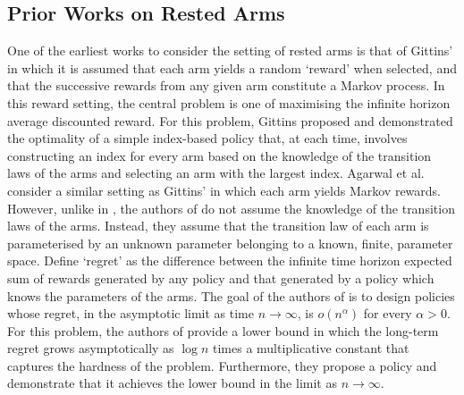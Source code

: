 \subsection{Prior Works on Rested Arms}
{One of the earliest works to consider the setting of rested arms is that of Gittins' \cite{gittins1979bandit} in which it is assumed that each arm yields a random `reward' when selected, and that the successive rewards from any given arm constitute a Markov process. In this reward setting, the central problem is one of maximising the infinite horizon average discounted reward. For this problem, Gittins proposed and demonstrated the optimality of a simple index-based policy that, at each time, involves constructing an index for every arm based on the knowledge of the transition laws of the arms and selecting an arm with the largest index. Agarwal et al. \cite{agrawal1989asymptotically} consider a similar setting as Gittins' in which each arm yields Markov rewards. However, unlike in  \cite{gittins1979bandit}, the authors of \cite{agrawal1989asymptotically} do not assume the knowledge of the transition laws of the arms. Instead, they assume that the transition law of each arm is parameterised by an unknown parameter belonging to a known, finite, parameter space. Define `regret' as the difference between the infinite time horizon expected sum of rewards generated by any policy and that generated by a policy which knows the parameters of the arms. The goal of the authors of \cite{agrawal1989asymptotically} is to design policies whose regret, in the asymptotic limit as time $n\to\infty$, is $o(n^\alpha)$ for every $\alpha>0$. For this problem, the authors of \cite{agrawal1989asymptotically} provide a lower bound in which the long-term regret grows asymptotically as $\log n$ times a multiplicative constant that captures the hardness of the problem. Furthermore, they propose a policy and demonstrate that it achieves the lower bound in the limit as $n\to \infty$.}

